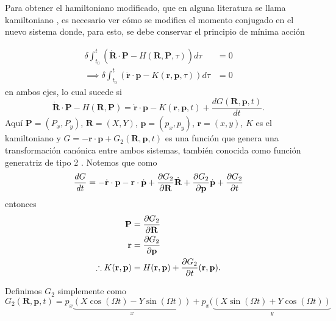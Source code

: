 
Para obtener el hamiltoniano modificado, que en alguna literatura se llama kamiltoniano \cite{Goldstein2007, Johns2011}, es necesario ver cómo se modifica el momento conjugado en el nuevo sistema donde, para esto, se debe conservar el principio de mínima acción

\begin{align}
 \delta \int_{t_0}^t \left( \dot{\mathbf{R}} \cdot \mathbf{P} - H(\mathbf{R}, \mathbf{P}, \tau) \right) d\tau &= 0 \nonumber \\
\implies \delta \int_{t_0}^t \left( \dot{\mathbf{r}} \cdot \mathbf{p} - K(\mathbf{r}, \mathbf{p}, \tau) \right) d\tau &= 0
 \label{eq:kamiltonian_condition}
\end{align}
en ambos ejes, lo cual sucede si
\begin{equation}
 \dot{\mathbf{R}} \cdot \mathbf{P} - H(\mathbf{R}, \mathbf{P}) = \dot{\mathbf{r}} \cdot \mathbf{p} - K(\mathbf{r}, \mathbf{p}, t) + \frac{dG(\mathbf{R}, \mathbf{p}, t)}{dt}.
\end{equation}
Aquí $\mathbf{P} = (P_x,P_y)$, $\mathbf{R} = (X,Y)$, $\mathbf{p} = (p_x,p_y)$, $\mathbf{r} = (x,y)$, $K$ es el kamiltoniano y $G = - \mathbf{r} \cdot \mathbf{p} + G_2(\mathbf{R}, \mathbf{p}, t)$ es una función que genera una transformación canónica entre ambos sistemas, también conocida como función generatriz de tipo 2 \cite{CanonicalTransformations}. Notemos que como 
\begin{align*}
 \frac{dG}{dt} =  - \dot{\mathbf{r}}\cdot \mathbf{p} - \mathbf{r}\cdot \dot{\mathbf{p}} + \frac{\partial G_2}{\partial \mathbf{R}}\dot{\mathbf{R}} + \frac{\partial G_2}{\partial \mathbf{p}}\dot{\mathbf{p}} + \frac{\partial G_2}{\partial t}
\end{align*}
entonces
\begin{align}
 \mathbf{P} &= \frac{\partial G_2}{\partial \mathbf{R}} \nonumber \\
 \mathbf{r} &= \frac{\partial G_2}{\partial \mathbf{p}} \nonumber \\
 \therefore K(\mathbf{r}, \mathbf{p}) &= H(\mathbf{r}, \mathbf{p}) + \frac{\partial G_2}{\partial t} (\mathbf{r}, \mathbf{p}).
 \label{eq:kamiltonian_formulae}
\end{align}

Definimos $G_2$ simplemente como
\begin{equation}
 G_2(\mathbf{R}, \mathbf{p}, t) = p_x \underbrace{\left( X \cos (\Omega t) - Y \sin (\Omega t) \right) }_{x} + p_x (\underbrace{ \left( X \sin (\Omega t) + Y \cos (\Omega t) \right)}_{y}
 \label{eq:generating_function}
\end{equation}

